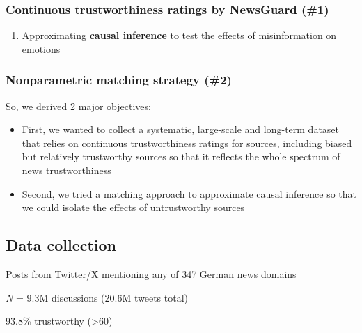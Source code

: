 \documentclass[
  letterpaper,
  DIV=11,
  numbers=noendperiod]{scrartcl}
\providecommand{\tightlist}{%
  \setlength{\itemsep}{0pt}\setlength{\parskip}{0pt}}\usepackage{longtable,booktabs,array}
\begin{document}
\hypertarget{continuous-trustworthiness-ratings-by-newsguard-1}{%
\subsubsection{Continuous trustworthiness ratings by NewsGuard
(\#1)}\label{continuous-trustworthiness-ratings-by-newsguard-1}}

\begin{enumerate}
\def\labelenumi{\arabic{enumi}.}
\setcounter{enumi}{1}
\tightlist
\item
  Approximating \textbf{causal inference} to test the effects of
  misinformation on emotions
\end{enumerate}

\hypertarget{nonparametric-matching-strategy-2}{%
\subsubsection{Nonparametric matching strategy
(\#2)}\label{nonparametric-matching-strategy-2}}

So, we derived 2 major objectives:

\begin{itemize}
\item
  First, we wanted to collect a systematic, large-scale and long-term
  dataset that relies on continuous trustworthiness ratings for sources,
  including biased but relatively trustworthy sources so that it
  reflects the whole spectrum of news trustworthiness
\item
  Second, we tried a matching approach to approximate causal inference
  so that we could isolate the effects of untrustworthy sources
\end{itemize}

\hypertarget{data-collection}{%
\subsection{Data collection}\label{data-collection}}

Posts from Twitter/X mentioning any of 347 German news domains

\emph{N} = 9.3M discussions (20.6M tweets total)

93.8\% trustworthy (\textgreater60)
\end{document}
